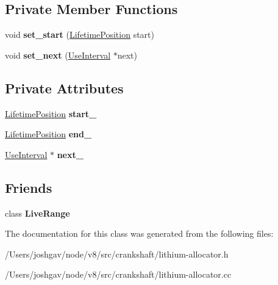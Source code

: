 \subsection*{Private Member Functions}
\begin{DoxyCompactItemize}
\item 
void {\bfseries set\+\_\+start} (\hyperlink{classv8_1_1internal_1_1_lifetime_position}{Lifetime\+Position} start)\hypertarget{classv8_1_1internal_1_1_use_interval_ab1bd250ef8c5cad41df0066d49c9f3a1}{}\label{classv8_1_1internal_1_1_use_interval_ab1bd250ef8c5cad41df0066d49c9f3a1}

\item 
void {\bfseries set\+\_\+next} (\hyperlink{classv8_1_1internal_1_1_use_interval}{Use\+Interval} $\ast$next)\hypertarget{classv8_1_1internal_1_1_use_interval_a2967cb247c71cd25ae5c9d98258e6499}{}\label{classv8_1_1internal_1_1_use_interval_a2967cb247c71cd25ae5c9d98258e6499}

\end{DoxyCompactItemize}
\subsection*{Private Attributes}
\begin{DoxyCompactItemize}
\item 
\hyperlink{classv8_1_1internal_1_1_lifetime_position}{Lifetime\+Position} {\bfseries start\+\_\+}\hypertarget{classv8_1_1internal_1_1_use_interval_aa74c7159086f78ce39d7b7b399bc9b70}{}\label{classv8_1_1internal_1_1_use_interval_aa74c7159086f78ce39d7b7b399bc9b70}

\item 
\hyperlink{classv8_1_1internal_1_1_lifetime_position}{Lifetime\+Position} {\bfseries end\+\_\+}\hypertarget{classv8_1_1internal_1_1_use_interval_a940d51d666561f9b7a5a6fd9db4dff72}{}\label{classv8_1_1internal_1_1_use_interval_a940d51d666561f9b7a5a6fd9db4dff72}

\item 
\hyperlink{classv8_1_1internal_1_1_use_interval}{Use\+Interval} $\ast$ {\bfseries next\+\_\+}\hypertarget{classv8_1_1internal_1_1_use_interval_a203b03b891e0d8e3c6f99d2794712776}{}\label{classv8_1_1internal_1_1_use_interval_a203b03b891e0d8e3c6f99d2794712776}

\end{DoxyCompactItemize}
\subsection*{Friends}
\begin{DoxyCompactItemize}
\item 
class {\bfseries Live\+Range}\hypertarget{classv8_1_1internal_1_1_use_interval_a05b53ec81357069e15d5d0e582589f6a}{}\label{classv8_1_1internal_1_1_use_interval_a05b53ec81357069e15d5d0e582589f6a}

\end{DoxyCompactItemize}


The documentation for this class was generated from the following files\+:\begin{DoxyCompactItemize}
\item 
/\+Users/joshgav/node/v8/src/crankshaft/lithium-\/allocator.\+h\item 
/\+Users/joshgav/node/v8/src/crankshaft/lithium-\/allocator.\+cc\end{DoxyCompactItemize}
